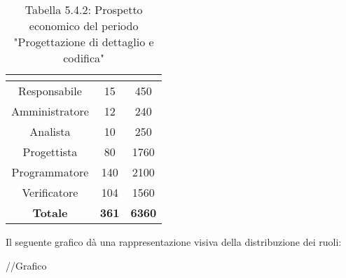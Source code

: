 \renewcommand{\arraystretch}{1.5}
\begin{table}[H]
\begin{center}
\begin{tabular}{|c|c|c|}
\hline
\rowcolor{title_row}
\textbf{\color{title_text}{Ruolo}}  & \textbf{\color{title_text}{Ore}} & \textbf{\color{title_text}{Costo in \euro}} \\ \hline
Responsabile    & 15           & 450                 \\ \hline
Amministratore  & 12           & 240                 \\ \hline
Analista        & 10           & 250                 \\ \hline
Progettista     & 80           & 1760                \\ \hline
Programmatore   & 140          & 2100                \\ \hline
Verificatore    & 104          & 1560                \\ \hline
\textbf{Totale} & \textbf{361}    & \textbf{6360}           \\ \hline
\end{tabular}
\caption{Tabella 5.4.2: Prospetto economico del periodo "Progettazione di dettaglio e codifica"\label{}}
\end{center}
\end{table}
\renewcommand{\arraystretch}{1}

Il seguente grafico dà una rappresentazione visiva della distribuzione dei ruoli: \\
\begin{center}
//Grafico
\end{center}

\pagebreak